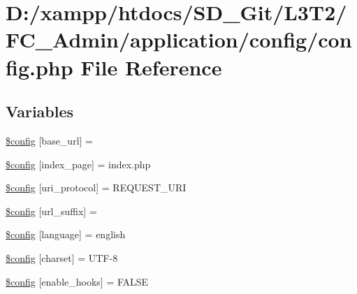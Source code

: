 \hypertarget{_admin_2application_2config_2config_8php}{}\section{D\+:/xampp/htdocs/\+S\+D\+\_\+\+Git/\+L3\+T2/\+F\+C\+\_\+\+Admin/application/config/config.php File Reference}
\label{_admin_2application_2config_2config_8php}
\subsection*{Variables}
\begin{DoxyCompactItemize}
\item 
\hyperlink{_admin_2application_2config_2config_8php_a8063081991a9d7087e6aea78db95a524}{\$config} \mbox{[}\textquotesingle{}base\+\_\+url\textquotesingle{}\mbox{]} = \textquotesingle{}\textquotesingle{}
\item 
\hyperlink{_admin_2application_2config_2config_8php_a64d47dc21f6eab24bf747cae9da5e7bb}{\$config} \mbox{[}\textquotesingle{}index\+\_\+page\textquotesingle{}\mbox{]} = \textquotesingle{}index.\+php\textquotesingle{}
\item 
\hyperlink{_admin_2application_2config_2config_8php_a37a0ed82a5db3c3aebdc12611e1e4498}{\$config} \mbox{[}\textquotesingle{}uri\+\_\+protocol\textquotesingle{}\mbox{]} = \textquotesingle{}R\+E\+Q\+U\+E\+S\+T\+\_\+\+U\+R\+I\textquotesingle{}
\item 
\hyperlink{_admin_2application_2config_2config_8php_a40da61bb27389d4c21a1271840ec7c40}{\$config} \mbox{[}\textquotesingle{}url\+\_\+suffix\textquotesingle{}\mbox{]} = \textquotesingle{}\textquotesingle{}
\item 
\hyperlink{_admin_2application_2config_2config_8php_ae05e29ba794fe4453013dd7b1cc30219}{\$config} \mbox{[}\textquotesingle{}language\textquotesingle{}\mbox{]} = \textquotesingle{}english\textquotesingle{}
\item 
\hyperlink{_admin_2application_2config_2config_8php_ac9128ac0276b1b7acf4c96a22b2469f1}{\$config} \mbox{[}\textquotesingle{}charset\textquotesingle{}\mbox{]} = \textquotesingle{}U\+T\+F-\/8\textquotesingle{}
\item 
\hyperlink{_admin_2application_2config_2config_8php_a2d80c3b160b2bb6f3329a9b07e970c51}{\$config} \mbox{[}\textquotesingle{}enable\+\_\+hooks\textquotesingle{}\mbox{]} = F\+A\+L\+S\+E

\end{DoxyCompactItemize}
